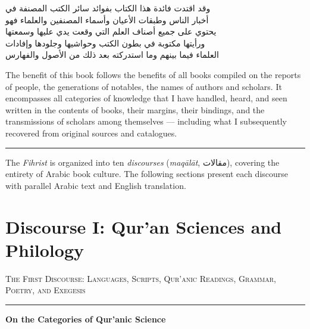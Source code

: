 \documentclass[11pt,a4paper]{article}
\newcommand{\longline}{\noindent\rule{\textwidth}{0.4pt}}
\newcommand{\ar}[1]{{\arabicfont\beginR #1\endR}}
\newcommand{\bilingual}[2]{%
  \noindent
  \begin{minipage}[t]{0.47\textwidth}
    \vspace{0pt}
    \begin{flushright}
    {\arabicfont\beginR #1\endR}
    \end{flushright}
  \end{minipage}%
  \hfill\vline\hfill
  \begin{minipage}[t]{0.47\textwidth}
    \vspace{0pt}
    #2
  \end{minipage}%
  \par\vspace{0.8em}
}
\newcommand{\bilingualsection}[2]{%
  \vspace{1em}%
  \noindent
  \begin{minipage}[t]{0.47\textwidth}
    \begin{flushright}
    \textsc{\color{sectioncolor}\ar{#1}}
    \end{flushright}
  \end{minipage}%
  \hfill
  \begin{minipage}[t]{0.47\textwidth}
    \textsc{\color{sectioncolor}#2}
  \end{minipage}%
  \par\vspace{0.5em}\hrule\vspace{0.8em}%
}
\newcommand{\bilingualsubsection}[2]{%
  \vspace{0.6em}%
  \noindent
  \begin{minipage}[t]{0.47\textwidth}
    \begin{flushright}
    \textbf{\color{sectioncolor}\ar{#1}}
    \end{flushright}
  \end{minipage}%
  \hfill
  \begin{minipage}[t]{0.47\textwidth}
    \textbf{\color{sectioncolor}#2}
  \end{minipage}%
  \par\vspace{0.4em}%
}
\begin{document}
\vspace{0.5em}
\bilingual
{وقد اقتدت فائدة هذا الكتاب بفوائد سائر الكتب المصنفة في\\
أخبار الناس وطبقات الأعيان وأسماء المصنفين والعلماء فهو\\
يحتوي على جميع أصناف العلم التي وقعت يدي عليها وسمعتها\\
ورأيتها مكتوبة في بطون الكتب وحواشيها وجلودها وإفادات\\
العلماء فيما بينهم وما استدركته بعد ذلك من الأصول والفهارس}
{The benefit of this book follows the benefits of all books compiled on
the reports of people, the generations of notables, the names of authors
and scholars. It encompasses all categories of knowledge that I have
handled, heard, and seen written in the contents of books, their margins,
their bindings, and the transmissions of scholars among themselves —
including what I subsequently recovered from original sources and catalogues.}

\vspace{1em}
\longline
\vspace{0.5em}

\noindent The \textit{Fihrist} is organized into ten \textit{discourses}
(\textit{maq\=al\=at}, \ar{مقالات}), covering the entirety of Arabic
book culture. The following sections present each discourse with parallel
Arabic text and English translation.

\newpage

\section{Discourse I: Qur'an Sciences and Philology}
\label{sec:I}

\bilingualsection{الفن الأول في اللغات والخطوط وقراءة القرآن والنحو والشعر والتفسير}{The First Discourse: Languages, Scripts, Qur'anic Readings, Grammar, Poetry, and Exegesis}

\bilingualsubsection{في أصناف العلم بالقرآن الكريم}{On the Categories of Qur'anic Science}
\end{document}
